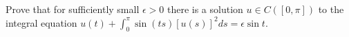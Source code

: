 Prove that for sufficiently small $\epsilon>0$ there is a solution
$u\in C([0,\pi])$ to the integral equation
$u(t)+\int_0^{\pi}\sin(ts)[u(s)]^2ds=\epsilon \sin t$.
